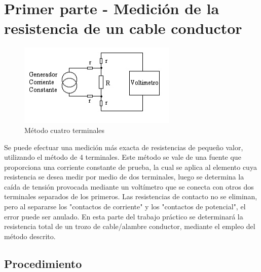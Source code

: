 \documentclass[12pt, letterpaper]{article}
\begin{document}
\section{Primer parte - Medición de la resistencia de un cable conductor}

\begin{figure}[H]
	\centering
	\includegraphics{imagenes/met_4_terminales.jpg}
	\caption{Método cuatro terminales}
    \label{fig:met_4_terminales}
\end{figure}

Se puede efectuar una medición más exacta de resistencias de pequeño valor, utilizando el método de 4 terminales. 
Este método se vale de una fuente que proporciona una corriente constante de prueba, la cual se aplica al elemento cuya resistencia
se desea medir por medio de dos terminales, luego se determina la caída de tensión provocada
mediante un voltímetro que se conecta con otros dos terminales separados de los primeros.
Las resistencias de contacto no se eliminan, pero al separarse los "contactos de corriente" y
los "contactos de potencial", el error puede ser anulado.
\singlespacing
En esta parte del trabajo práctico se determinará la resistencia total de un
trozo de cable/alambre conductor, mediante el empleo del método descrito. 
\singlespacing

\subsection{Procedimiento}
\end{document}
